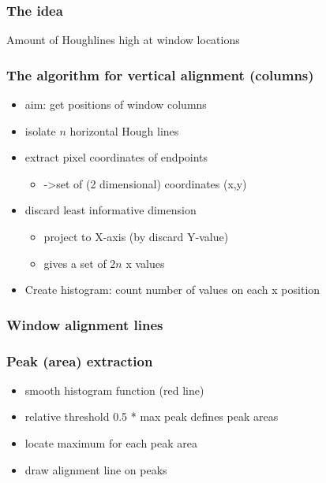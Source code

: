 \documentclass{beamer}
\begin{document}
\frame
{
	\frametitle{The idea}
	\item Amount of Houghlines high at window locations
}

\frame
{
	\frametitle{The algorithm for vertical alignment (columns)}
	\begin{itemize}
	\item aim: get positions of window columns
	\item isolate $n$ horizontal Hough lines
	\item extract pixel coordinates of endpoints 
		\begin{itemize}
		\item ->set of (2 dimensional) coordinates (x,y)
		\end{itemize}
	\item discard least informative dimension
		\begin{itemize}
		\item project to X-axis (by discard Y-value) 
		\item gives a set of $2n$ x values 
		\end{itemize}
	\item Create histogram: count number of values on each x position
	\end{itemize}
}

\frame
{
	\frametitle{Window alignment lines}
	\begin{itemize}
	\end{itemize}
}
\frame
{
	\frametitle{Peak (area) extraction}
	\begin{itemize}
	\item smooth histogram function (red line) 
	\item relative threshold 0.5 * max peak defines peak areas
	\item locate maximum for each peak area
	\item draw alignment line on peaks
	\end{itemize}
}
\end{document}
